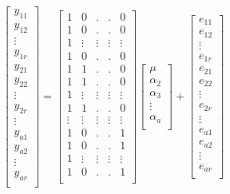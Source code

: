 \documentclass[
]{book}
\theoremstyle{definition}
\theoremstyle{definition}
\theoremstyle{definition}
\theoremstyle{definition}
\theoremstyle{remark}
\begin{document}
\begin{equation}
\begin{bmatrix}
y_{11} \\
y_{12} \\
\vdots \\
y_{1r} \\
y_{21} \\
y_{22} \\
\vdots \\
y_{2r} \\
\vdots \\
y_{a1} \\
y_{a2} \\
\vdots \\
y_{ar} \\
\end{bmatrix} 
 =
\begin{bmatrix}
1 &  0 & . & . & 0 \\
1 &  0 & . & . & 0 \\
1 &  \vdots & \vdots & \vdots & \vdots \\
1 &  0 & . & . & 0 \\
1 &  1 & . & . & 0 \\
1 &  1 & . & . & 0 \\
1 &  \vdots & \vdots & \vdots & \vdots \\
1 &  1 & . & . & 0 \\
\vdots &  \vdots & \vdots & \vdots & \vdots \\
1 &  0 & . & . & 1 \\
1 &  0 & . & . & 1 \\
1 &  \vdots & \vdots & \vdots & \vdots \\
1 &  0 & . & . & 1 \\
\end{bmatrix}
\begin{bmatrix}
\mu \\
\alpha_{2} \\
\alpha_{3} \\
\vdots \\
\alpha_{a} \\
\end{bmatrix} +
\begin{bmatrix}
e_{11} \\
e_{12} \\
\vdots \\
e_{1r} \\
e_{21} \\
e_{22} \\
\vdots \\
e_{2r} \\
\vdots \\
e_{a1} \\
e_{a2} \\
\vdots \\
e_{ar} \\
\end{bmatrix}
\label{eq:lm-zero}
\end{equation}
\end{document}
